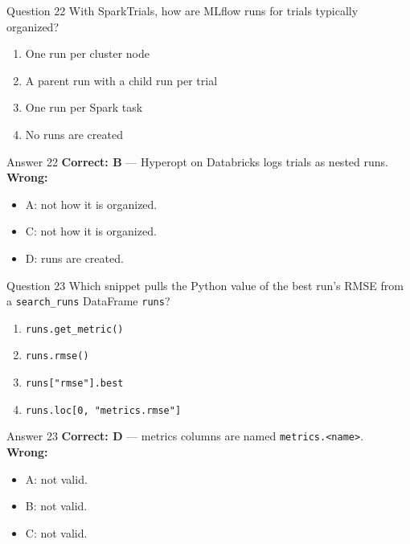 \documentclass[aspectratio=169,11pt]{beamer}
\begin{document}
\begin{frame}{Question 22}
With SparkTrials, how are MLflow runs for trials typically organized?
\begin{enumerate}[label=\Alph*.]
\item One run per cluster node
\item A parent run with a child run per trial
\item One run per Spark task
\item No runs are created
\end{enumerate}
\end{frame}
\begin{frame}{Answer 22}
\textbf{Correct: B} --- Hyperopt on Databricks logs trials as nested runs.\\
\vspace{0.5em}
\textbf{Wrong:}
\begin{itemize}
\item A: not how it is organized.
\item C: not how it is organized.
\item D: runs are created.
\end{itemize}
\end{frame}

\begin{frame}{Question 23}
Which snippet pulls the Python value of the best run's RMSE from a \texttt{search\_runs} DataFrame \texttt{runs}?
\begin{enumerate}[label=\Alph*.]
\item \texttt{runs.get\_metric()}
\item \texttt{runs.rmse()}
\item \texttt{runs["rmse"].best}
\item \texttt{runs.loc[0, "metrics.rmse"]}
\end{enumerate}
\end{frame}
\begin{frame}{Answer 23}
\textbf{Correct: D} --- metrics columns are named \texttt{metrics.<name>}.\\
\vspace{0.5em}
\textbf{Wrong:}
\begin{itemize}
\item A: not valid.
\item B: not valid.
\item C: not valid.
\end{itemize}
\end{frame}
\end{document}
